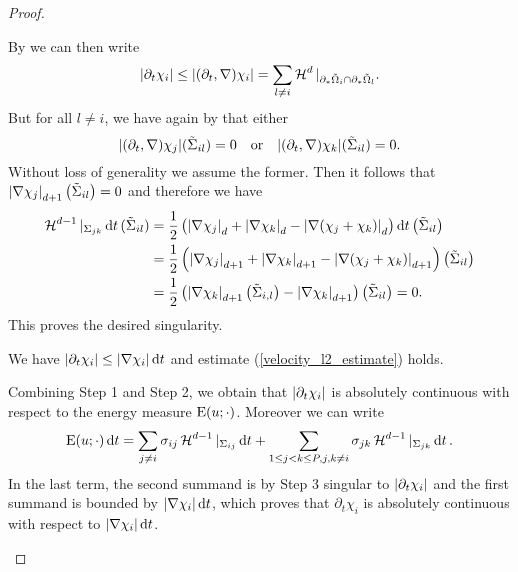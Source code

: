 \begin{proof}
\begin{description}[wide=0pt]
		By  we can then write
		\begin{equation*}
			\abs{ \partial_{ t } \chi_{ i } }
			\leq
			\abs{ ( \partial_{ t } , \nabla ) \chi_{ i } }
			=
			\sum_{ l \neq i }
				\operatorname{\mathcal{H}}^{ d } |_{ \partial_{ \ast } \tilde{ \Omega }_{ i } \cap \partial_{ \ast } \tilde{ \Omega }_{ l } }.
		\end{equation*}
		But for all $ l \neq i $, we have again by  that either 
		\begin{equation*}
			\abs{ ( \partial_{ t } , \nabla ) \chi_{ j } } ( \tilde{ \Sigma }_{ 
			i l } ) = 0 
			\quad \text{or} \quad
			\abs{ ( \partial_{ t } , \nabla ) \chi_{ k } } ( \tilde{ \Sigma }_{ 
			i l } ) = 0.
		\end{equation*}
		Without loss of generality we assume the former. 
		Then it follows that $ \abs{ \nabla \chi_{ j } }_{ d + 1 } \left( 
		\tilde{ \Sigma }_{ i l } \right) = 0 $ and therefore we have
		\begin{align*}
			\operatorname{\mathcal{H}}^{ d - 1 } |_{ \Sigma_{ j k } } \dd{ t } ( \tilde{ \Sigma }_{ i 
			l } )
			& =
			\frac{ 1 }{ 2 } \left(
				\abs{ \nabla \chi_{ j } }_{ d }
				+
				\abs{ \nabla \chi_{ k } }_{ d }
				-
				\abs{ \nabla ( \chi_{ j } + \chi_{ k } ) }_{ d }
			\right)
			\dd{ t }
			\left( \tilde{ \Sigma }_{ i l }\right)
			\\
			& = 
			\frac{ 1 }{ 2 } \left(
				\abs{ \nabla \chi_{ j } }_{ d+1 }
				+
				\abs{ \nabla \chi_{ k } }_{ d +1 }
				-
				\abs{ \nabla ( \chi_{ j } + \chi_{ k } ) }_{ d+ 1 }
			\right) \left( \tilde{ \Sigma }_{ i l } \right)
			\\
			& = 
			\frac{ 1 }{ 2 } \left( 
				\abs{ \nabla \chi_{ k } }_{ d + 1 } \left( \tilde{ \Sigma } _{ i , l } \right)
				-
				\abs{ \nabla \chi_{ k } }_{ d + 1 } 
			\right)
			\left( \tilde{ \Sigma } _{ i l } \right)
			= 0.		
		\end{align*}
		This proves the desired singularity.
		
		\item[Step 4:] We have 
		$ \abs{ \partial_{ t } \chi_{ i } } 
		\leq \abs{ \nabla \chi_{ i } } \dd{ t } $ and estimate (\ref{velocity_l2_estimate}) holds.
		
		Combining Step 1 and Step 2, we obtain that $ \abs{ \partial_{ t } \chi_{ i } } $ is absolutely continuous with respect to the energy measure $ \operatorname{E} ( u ; \cdot ) $. Moreover we can write
		\begin{equation*}
			\operatorname{E} ( u ; \cdot ) \dd{ t }
			=
			\sum_{ j \neq i }
				\sigma_{ i j }
				\operatorname{\mathcal{H}}^{ d - 1 } |_{ \Sigma_{ i j } }
				\dd{ t }
			+
			\sum_{ 1 \leq j < k \leq P , j, k \neq i }
				\sigma_{ j k }
				\operatorname{\mathcal{H}}^{ d- 1 } |_{ \Sigma_{ j k } }
				\dd{ t }.
		\end{equation*}
		In the last term, the second summand is by Step 3 singular to $ \abs{ \partial_{ t } \chi_{ i } } $ and the first summand is bounded by $ \abs{ \nabla \chi_{ i } } \dd{ t } $, which proves that $ \partial_{ t } \chi_{ i } $ is absolutely continuous with respect to $ \abs{ \nabla \chi_{ i } } \dd{ t } $.
		

\end{description}
\end{proof}
